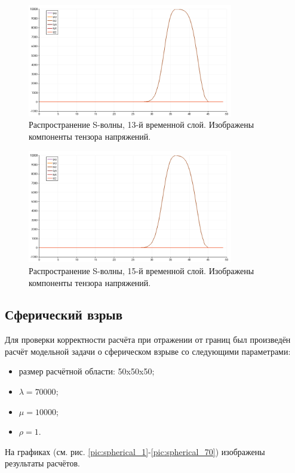 \begin{figure}[htp]
\centering
\includegraphics[width=0.8\textwidth]{png/s-wave-test/s/0013.png}
\caption{Распространение S-волны, 13-й временной слой. Изображены компоненты тензора напряжений.}
\end{figure}

\begin{figure}[htp]
\centering
\includegraphics[width=0.8\textwidth]{png/s-wave-test/s/0015.png}
\caption{Распространение S-волны, 15-й временной слой. Изображены компоненты тензора напряжений.}
\label{pic:s_wave_15}
\end{figure}

\clearpage
\newpage

\subsection{Сферический взрыв}
Для проверки корректности расчёта при отражении от границ был произведён расчёт
модельной задачи о сферическом взрыве со следующими параметрами:
\begin{itemize}
\item размер расчётной области: 50x50x50;
\item $\lambda=70000$;
\item $\mu=10000$;
\item $\rho=1$.
\end{itemize}
На графиках (см. рис. \ref{pic:spherical_1}-\ref{pic:spherical_70}) изображены
результаты расчётов.

